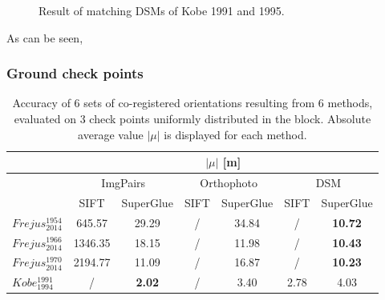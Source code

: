 \begin{figure}[htbp]
\begin{center}
{\begin{minipage}[t]{0.45\linewidth}
            \end{minipage}%
        }
        \caption{Result of matching DSMs of Kobe 1991 and 1995.}
        \label{Match result}
    \end{center}
\end{figure} 

As can be seen, 


\subsubsection{Ground check points}

\begin{table}%
    \footnotesize
    \centering
    \begin{tabular}{|l|c|c|c|c|c|c|}\hline
        &\multicolumn{6}{c|}{$|\mu|$ [m]}\\\hline
        &\multicolumn{2}{c|}{ImgPairs} &\multicolumn{2}{c|}{Orthophoto} &\multicolumn{2}{c|}{DSM}\\\hline
        & SIFT & SuperGlue & SIFT & SuperGlue & SIFT & SuperGlue \\\hline\hline
        $Frejus_{2014}^{1954}$ & 645.57 & 29.29 & / & 34.84 & / & \textbf{10.72}\\\hline
        $Frejus_{2014}^{1966}$ & 1346.35 & 18.15 & / & 11.98 & / & \textbf{10.43}\\\hline
        $Frejus_{2014}^{1970}$ & 2194.77 & 11.09 & / & 16.87 & / & \textbf{10.23}\\\hline\hline
        $Kobe_{1994}^{1991}$ & / & \textbf{2.02} & / & 3.40 & 2.78 & 4.03 \\\hline
\end{tabular}
    \caption{Accuracy of 6 sets of co-registered orientations resulting from 6 methods, evaluated on 3 check points uniformly distributed in the block. Absolute average value $|\mu|$ is displayed for each method.}
    \label{CheckptAcuracy}
\end{table}

